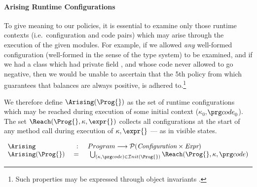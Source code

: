 

\paragraph{Arising Runtime Configurations}
\label{formal:arising}  

To give meaning to our   policies,  it is essential
to examine  only  those runtime contexts (i.e.\ configuration and code pairs) which
may arise through the execution of the given modules.
\forget
{For example, if we allowed {\em any} well-formed configuration (well-formed in the sense of the type system) to be examined, and if we had a  class which had private field , and whose code never allowed   to go negative, then  we would be unable to ascertain that the 5th policy from \cite{ELang} which guarantees that balances are always positive, is adhered to.\footnote{Such properties may be expressed through object invariants \cite{Mey88,LeinoMueller04}.}
}

We therefore define $\Arising(\Prog{})$ as the set of runtime configurations
which may be reached during execution of some initial context ($\kappa_0$,$\code_0$).
 The set $\Reach(\Prog{}, \kappa, \expr{})$
  collects all configurations at the start of any method call during execution of $\kappa, \expr{}$ --- as in visible states.

\begin{definition} $ $ \\
$\begin{array}{lcl}
 \Arising & : &  Program    \longrightarrow \mathcal{P}( \textit{Configuration} \times \textit{Expr}  )
\\
 \Arising(\Prog{}) \ &    = \  & \ \bigcup_{(\kappa,\code{})\in {\mathcal{I}nit}(\Prog{})} \Reach(\Prog{}, \kappa, \code{})
\end{array}$
\end{definition}




